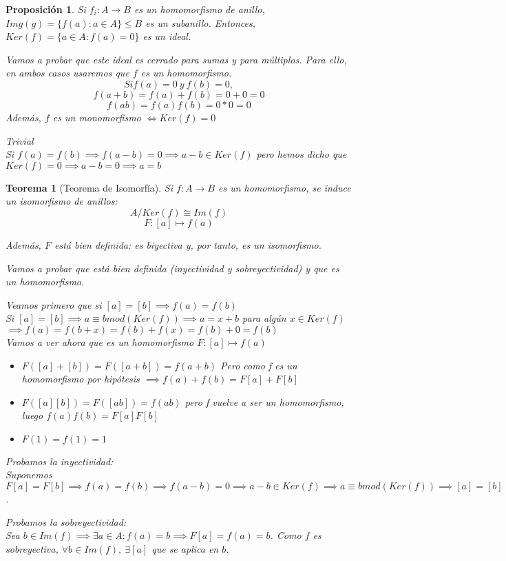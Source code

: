 \documentclass[11pt, a4paper, titlepage]{article}
\makeatletter
\renewenvironment{proof}[1][\proofname] {\vspace{-15pt}\par\pushQED{\qed}\normalfont\topsep6\p@\@plus6\p@\relax\trivlist\item[\hskip\labelsep\it#1\@addpunct{.}]\ignorespaces}{\popQED\endtrivlist\@endpefalse}
\theoremstyle{theorem-style}
\newtheorem*{nth}{Teorema}
\newtheorem*{nprop}{Proposición}
\theoremstyle{definition-style}
\theoremstyle{remark-style}
\theoremstyle{example-style}
\makeatother
\begin{document}
\begin{nprop}
	Si $f_i:A \to B$ es un homomorfismo de anillo, $Img(g) = \{f(a): a \in A\} \leq B$ es un subanillo. Entonces, $Ker(f) = \{a \in A: f(a) = 0\}$ es un ideal.
	\begin{proof}
	Vamos a probar que este ideal es cerrado para sumas y para múltiplos. Para ello, en ambos casos usaremos que $f$ es un homomorfismo.
	\[
	Si f(a) = 0 \ y \ f(b) = 0,\]\[
	f(a+b) = f(a)+f(b) = 0 + 0 = 0\]\[
	f(ab) = f(a)f(b) = 0*0 = 0
	\]
\end{proof}
Además, $f$ es un monomorfismo $\iff Ker(f) = 0$
\begin{proof}
	\boxed{\Rightarrow} Trivial\\
	\boxed{\Leftarrow} Si $f(a) = f(b) \implies f(a-b) = 0 \implies a-b \in Ker(f)$ pero hemos dicho que $Ker(f) = 0 \implies a-b = 0 \implies a = b$
\end{proof}
\end{nprop}

\begin{nth}[Teorema de Isomorfía]
	Si $f:A \to B$ es un homomorfismo, se induce un isomorfismo de anillos:
	\[
	A/Ker(f) \cong Im(f)
	\]
	\[
	F:[a] \longmapsto f(a)
	\]
	
Además, $F$ está bien definida: es biyectiva y, por tanto, es un isomorfismo.

\begin{proof}
	Vamos a probar que está bien definida (inyectividad y sobreyectividad) y que es un homomorfismo.
	
	Veamos primero que si $[a] = [b] \implies f(a) = f(b)$\\
	Si $[a] = [b] \implies a \equiv b mod(Ker(f)) \implies a = x+b$ para algún $x\in Ker(f)$\\
	$\implies f(a) = f(b+x) = f(b) +f(x) = f(b) + 0 = f(b)$\\
	
	Vamos a ver ahora que es un homomorfismo $F:[a] \mapsto f(a)$
	\begin{itemize}
		\item $F([a]+[b]) = F([a+b]) = f(a+b)$ Pero como f es un homomorfismo por hipótesis $\implies f(a)+f(b) = F[a] + F[b]$
		\item $F([a][b]) = F([ab]) = f(ab)$ pero f vuelve a ser un homomorfismo, luego $f(a)f(b) = F[a]F[b]$
		\item $F(1) = f(1) = 1$
\end{itemize}
Probamos la inyectividad:\\
Suponemos $F[a] = F[b] \implies f(a) = f(b) \implies f(a-b) = 0 \implies a-b \in Ker(f) \implies a \equiv bmod(Ker(f)) \implies [a] = [b]$.

Probamos la sobreyectividad:\\
Sea $b \in Im(f) \implies \exists a \in A : f(a) = b \implies F[a] = f(a) = b$. Como $f$ es sobreyectiva, $\forall b \in Im(f), \ \exists [a]$ que se aplica en $b$.
\end{proof}

\end{nth}
\end{document}
